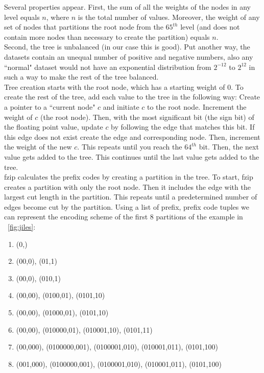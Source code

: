 \indent Several properties appear. First, the sum of all the weights of the nodes in any level equals $n$, where $n$ is the total number of values. Moreover, the weight of any set of nodes that partitions the root node from the $65^{th}$ level (and does not contain more nodes than necessary to create the partition) equals $n$.\\
\indent Second, the tree is unbalanced (in our case this is good). Put another way, the datasets contain an unequal number of positive and negative numbers, also any ``normal" dataset would not have an exponential distribution from $2^{-12}$ to $2^{12}$ in such a way to make the rest of the tree balanced.\\
\indent Tree creation starts with the root node, which has a starting weight of 0. To create the rest of the tree, add each value to the tree in the following way: Create a pointer to a ``current node" $c$ and initiate $c$ to the root node. Increment the weight of $c$ (the root node). Then, with the most significant bit (the sign bit) of the floating point value, update $c$ by following the edge that matches this bit. If this edge does not exist create the edge and corresponding node. Then, increment the weight of the new $c$. This repeats until you reach the $64^{th}$ bit. Then, the next value gets added to the tree. This continues until the last value gets added to the tree.\\ 
\indent fzip calculates the prefix codes by creating a partition in the tree. To start, fzip creates a partition with only the root node. Then it includes the edge with the largest cut length in the partition. This repeats until a predetermined number of edges become cut by the partition. Using a list of prefix, prefix code tuples we can represent the encoding scheme of the first 8 partitions of the example in \figurename~\ref{fig:jiles}:\par
\begin{enumerate}
    \item (0,)
    \item (00,0), (01,1)
    \item (00,0), (010,1)
    \item (00,00), (0100,01), (0101,10)
    \item (00,00), (01000,01), (0101,10)
    \item (00,00), (010000,01), (010001,10), (0101,11)
    \item (00,000), (0100000,001), (0100001,010), (010001,011), (0101,100)
    \item (001,000), (0100000,001), (0100001,010), (010001,011), (0101,100)
\end{enumerate} \par
